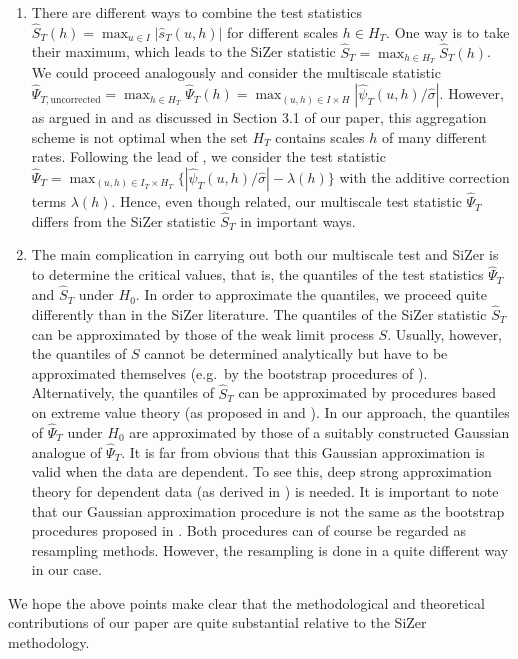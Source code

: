 \documentclass[a4paper,12pt]{article}
\begin{document}
\begin{enumerate}[label=(\roman*), leftmargin=0.8cm]
\item There are different ways to combine the test statistics $\widehat{S}_T(h) = \max_{u \in I} |\widehat{s}_T(u,h)|$ for different scales $h \in H_T$. One way is to take their maximum, which leads to the SiZer statistic $\widehat{S}_T = \max_{h \in H_T} \widehat{S}_T(h)$. We could proceed analogously and consider the multiscale statistic $\widehat{\Psi}_{T,\text{uncorrected}} = \max_{h \in H_T} \widehat{\Psi}_T(h) = \max_{(u,h) \in I \times H} |\widehat{\psi}_T(u,h)/\widehat{\sigma}|$. However, as argued in \cite{DuembgenSpokoiny2001} and as discussed in Section 3.1 of our paper, this aggregation scheme is not optimal when the set $H_T$ contains scales $h$ of many different rates. Following the lead of \cite{DuembgenSpokoiny2001}, we consider the test statistic $\widehat{\Psi}_T = \max_{(u,h) \in I_T \times H_T} \{ |\widehat{\psi}_T(u,h)/\widehat{\sigma}| - \lambda(h) \}$ with the additive correction terms $\lambda(h)$. Hence, even though related, our multiscale test statistic $\widehat{\Psi}_T$ differs from the SiZer statistic $\widehat{S}_T$ in important ways. 

\item The main complication in carrying out both our multiscale test and SiZer is to determine the critical values, that is, the quantiles of the test statistics $\widehat{\Psi}_T$ and $\widehat{S}_T$ under $H_0$. In order to approximate the quantiles, we proceed quite differently than in the SiZer literature. The quantiles of the SiZer statistic $\widehat{S}_T$ can be approximated by those of the weak limit process $S$. Usually, however, the quantiles of $S$ cannot be determined analytically but have to be approximated themselves (e.g.\ by the bootstrap procedures of \cite{ChaudhuriMarron1999, ChaudhuriMarron2000}). Alternatively, the quantiles of $\widehat{S}_T$ can be approximated by procedures based on extreme value theory (as proposed in \cite{HannigMarron2006} and \cite{ParkHannigKang2009}). In our approach, the quantiles of $\widehat{\Psi}_T$ under $H_0$ are approximated by those of a suitably constructed Gaussian analogue of $\widehat{\Psi}_T$. It is far from obvious that this Gaussian approximation is valid when the data are dependent. To see this, deep strong approximation theory for dependent data (as derived in \cite{BerkesLiuWu2014}) is needed. It is important to note that our Gaussian approximation procedure is not the same as the bootstrap procedures proposed in \cite{ChaudhuriMarron1999, ChaudhuriMarron2000}. Both procedures can of course be regarded as resampling methods. However, the resampling is done in a quite different way in our case.

\end{enumerate}
We hope the above points make clear that the methodological and theoretical contributions of our paper are quite substantial relative to the SiZer methodology. 
\vspace{10pt}
\end{document}
